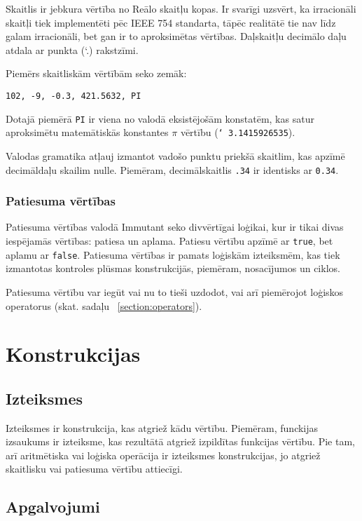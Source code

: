 \documentclass[12pt,a4paper]{report}
\begin{document}
Skaitlis ir jebkura vērtība no Reālo skaitļu kopas. Ir svarīgi uzsvērt, ka irracionāli skaitļi tiek implementēti pēc IEEE 754 standarta, tāpēc realitātē tie nav līdz galam irracionāli, bet gan ir to aproksimētas vērtības. Daļskaitļu decimālo daļu atdala ar punkta (\char`.) rakstzīmi.

Piemērs skaitliskām vērtībām seko zemāk:

\begin{verbatim}
102, -9, -0.3, 421.5632, PI
\end{verbatim}

Dotajā piemērā \texttt{PI} ir viena no valodā eksistējošām konstatēm, kas satur aproksimētu matemātiskās konstantes $\pi$ vērtību (\texttt{\char`~3.1415926535}).

Valodas gramatika atļauj izmantot vadošo punktu priekšā skaitlim, kas apzīmē decimāldaļu skailim nulle. Piemēram, decimālskaitlis \texttt{.34} ir identisks ar \texttt{0.34}.


\subsubsection{Patiesuma vērtības}

Patiesuma vērtības valodā Immutant seko divvērtīgai loģikai, kur ir tikai divas iespējamās vērtības: patiesa un aplama. Patiesu vērtību apzīmē ar \texttt{true}, bet aplamu ar \texttt{false}. Patiesuma vērtības ir pamats loģiskām izteiksmēm, kas tiek izmantotas kontroles plūsmas konstrukcijās, piemēram, nosacījumos un ciklos. 

Patiesuma vērtību var iegūt vai nu to tieši uzdodot, vai arī piemērojot loģiskos operatorus (skat. sadaļu ~\ref{section:operators}).

\section{Konstrukcijas}

\subsection{Izteiksmes}

Izteiksmes ir konstrukcija, kas atgriež kādu vērtību. Piemēram, funckijas izsaukums ir izteiksme, kas rezultātā atgriež izpildītas funkcijas vērtību. Pie tam, arī aritmētiska vai loģiska operācija ir izteiksmes konstrukcijas, jo atgriež skaitlisku vai patiesuma vērtību attiecīgi.

\subsection{Apgalvojumi}
\end{document}
